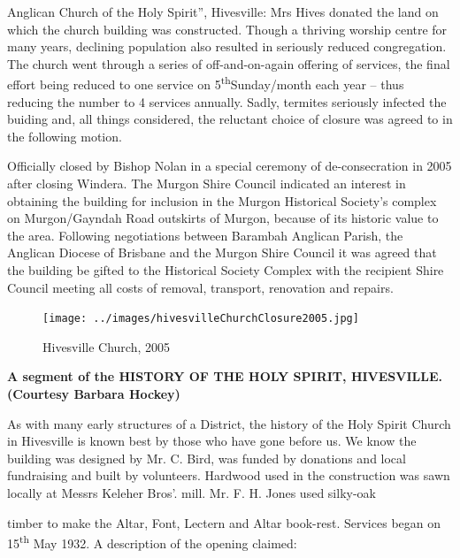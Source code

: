 Anglican Church of the Holy Spirit'', Hivesville: Mrs Hives donated the land on which the church building was constructed. Though a thriving worship centre for many years, declining population also resulted in seriously reduced congregation. The church went through a series of off-and-on-again offering of services, the final effort being reduced to one service on 5\textsuperscript{th}Sunday/month each year -- thus reducing the number to 4 services annually. Sadly, termites seriously infected the buiding and, all things considered, the reluctant choice of closure was agreed to in the following motion.



Officially closed by Bishop Nolan in a special ceremony of de-consecration in 2005 after closing Windera. The Murgon Shire Council indicated an interest in obtaining the building for inclusion in the Murgon Historical Society's complex on Murgon/Gayndah Road outskirts of Murgon, because of its historic value to the area. Following negotiations between Barambah Anglican Parish, the Anglican Diocese of Brisbane and the Murgon Shire Council it was agreed that the building be gifted to the Historical Society Complex with the recipient Shire Council meeting all costs of removal, transport, renovation and repairs.









\begin{figure}[!htb]
\begin{center}
\texttt{[image: ../images/hivesvilleChurchClosure2005.jpg]}
\caption{Hivesville Church, 2005}
\end{center}
\end{figure}


\textbf{A segment of the HISTORY OF THE HOLY SPIRIT, HIVESVILLE. (Courtesy Barbara Hockey)}



As with many early structures of a District, the history of the Holy Spirit Church in Hivesville is known best by those who have gone before us. We know the building was designed by Mr. C. Bird, was funded by donations and local fundraising and built by volunteers. Hardwood used in the construction was sawn locally at Messrs Keleher Bros'. mill. Mr. F. H. Jones used silky-oak



timber to make the Altar, Font, Lectern and Altar book-rest. Services began on 15\textsuperscript{th} May 1932. A description of the opening claimed:



